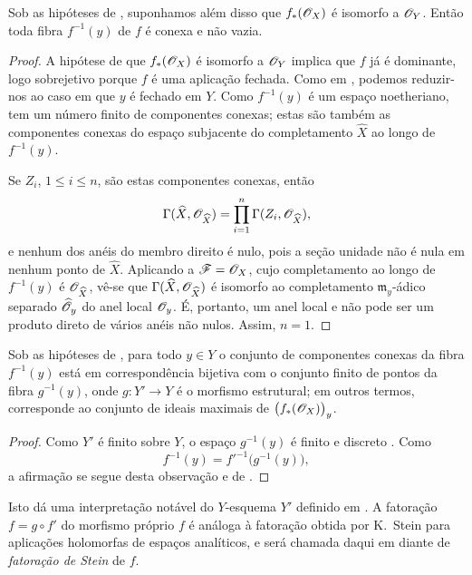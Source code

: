 \begin{corollary}[4.3.2]
\label{III.4.3.2}
Sob as hipóteses de , suponhamos além disso que
$f_*(\mathscr{O}_X)$ é isomorfo a $\mathscr{O}_Y$. Então toda fibra
$f^{-1}(y)$ de $f$ é conexa e não vazia.
\end{corollary}

\begin{proof}
A hipótese de que $f_*(\mathscr{O}_X)$ é isomorfo a $\mathscr{O}_Y$ implica
que $f$ já é dominante, logo sobrejetivo porque $f$ é uma
aplicação fechada. Como em , podemos reduzir-nos ao
caso em que $y$ é fechado em $Y$. Como $f^{-1}(y)$ é um espaço
noetheriano, tem um número finito de componentes conexas; estas são
também as componentes conexas do espaço subjacente do
completamento $\widehat{X}$ ao longo de $f^{-1}(y)$.

Se $Z_i$, $1\leq i\leq n$, são estas componentes conexas, então
\[
  \Gamma(\widehat{X},\mathscr{O}_{\widehat{X}})
  =
  \prod_{i=1}^{n}\Gamma(Z_i,\mathscr{O}_{\widehat{X}}),
\]
e nenhum dos anéis do membro direito é nulo, pois a seção
unidade não é nula em nenhum ponto de $\widehat{X}$. Aplicando
 a $\mathscr{F}=\mathscr{O}_X$, cujo completamento ao longo de
$f^{-1}(y)$ é $\mathscr{O}_{\widehat{X}}$, vê-se que
$\Gamma(\widehat{X},\mathscr{O}_{\widehat{X}})$ é isomorfo ao
completamento $\mathfrak{m}_y$-ádico separado
$\widehat{\mathscr{O}}_y$ do anel local $\mathscr{O}_y$. É, portanto, um
anel local e não pode ser um produto direto de vários anéis não
nulos. Assim, $n=1$.
\end{proof}

\begin{corollary}[4.3.3]
\label{III.4.3.3}
Sob as hipóteses de , para todo $y\in Y$ o conjunto
de componentes conexas da fibra $f^{-1}(y)$ está em correspondência
bijetiva com o conjunto finito de pontos da fibra
$g^{-1}(y)$, onde $g:Y'\to Y$ é o morfismo estrutural; em outros
termos, corresponde ao conjunto de ideais maximais de
$\bigl(f_*(\mathscr{O}_X)\bigr)_y$.
\end{corollary}

\begin{proof}
Como $Y'$ é finito sobre $Y$, o espaço $g^{-1}(y)$ é finito e
discreto . Como
\[
  f^{-1}(y)=f'^{-1}\bigl(g^{-1}(y)\bigr),
\]
a afirmação se segue desta observação e de
.
\end{proof}

Isto dá uma interpretação notável do $Y$-esquema $Y'$ definido em
. A fatoração
$f=g\circ f'$ do morfismo próprio $f$ é análoga à fatoração
obtida por K.~Stein para aplicações holomorfas de espaços
analíticos, e será chamada daqui em diante de \emph{fatoração de Stein}
de $f$.

